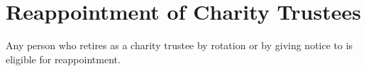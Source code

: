 \section{Reappointment of Charity Trustees}\label{sec:reappointment}
Any person who retires as a charity trustee by rotation or by giving notice to \shortname{} is eligible for reappointment.
